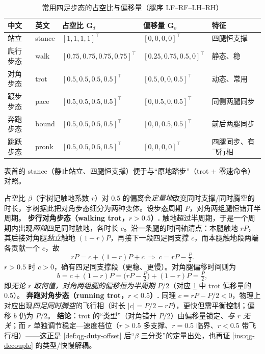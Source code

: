 \begin{table}[H]\centering\small
\caption{常用四足步态的占空比与偏移量（腿序 LF–RF–LH–RH）}
\begin{tabular}{lllll}
\toprule
中文 & 英文 & 占空比 $\mathbf{G}_d$ & 偏移量 $\mathbf{G}_o$ & 特征 \\
\midrule
站立 & stance & $[1,1,1,1]^\top$ & $[0,0,0,0]^\top$ & 四腿恒支撑 \\
爬行步态 & walk & $[0.75,0.75,0.75,0.75]^\top$ & $[0.25,0.75,0.5,0]^\top$ & 静态、稳 \\
对角步态 & trot & $[0.5,0.5,0.5,0.5]^\top$ & $[0.5,0,0,0.5]^\top$ & 动态、常用 \\
踱步步态 & pace & $[0.5,0.5,0.5,0.5]^\top$ & $[0,0.5,0,0.5]^\top$ & 同侧两腿同步 \\
奔跑步态 & bound & $[0.5,0.5,0.5,0.5]^\top$ & $[0,0,0.5,0.5]^\top$ & 前后两腿同步 \\
跳跃步态 & pronk & $[0.5,0.5,0.5,0.5]^\top$ & $[0,0,0,0]^\top$ & 四腿同步、有飞行相 \\
\bottomrule
\end{tabular}
\label{tab:qg-gaits}
\end{table}
表首的 stance（静止站立、四腿恒支撑）便于与“原地踏步”（trot $+$ 零速命令）对照。

\begin{example}\label{exam:qg-trot-variants}
占空比 $\beta$（宇树记触地系数 $r$）对 $0.5$ 的偏离会\emph{定量地}改变同时支撑/同时腾空的时长，宇树据此把对角步态细分为两种变体\cite{unitree2023quadruped}。设步态周期 $P$，对角两组腿恒错开半周期。
\textbf{步行对角步态（walking trot，$r>0.5$）.} 触地超过半周期，于是一个周期内出现\emph{两段}四足同时触地，各时长 $c$。沿一条腿的时间轴清点：本腿触地 $rP$，其后接对角腿\emph{独立}触地 $(1-r)P$，再接下一段四足同支撑 $c$，而本腿触地段两端各贡献一个 $c$，故
\begin{equation}
  rP=c+(1-r)P+c\ \Longrightarrow\ c=rP-\tfrac{P}{2}.
  \label{eq:qg-trot-overlap}
\end{equation}
$r>0.5$ 时 $c>0$，确有四足同支撑段（更稳、更慢）。对角腿偏移时间则为
\begin{equation}
  b=c+(1-r)P=\Big(rP-\tfrac{P}{2}\Big)+(1-r)P=\tfrac{P}{2},
  \label{eq:qg-trot-offset}
\end{equation}
即\emph{无论 $r$ 取何值，对角两组腿的偏移恒为半周期} $P/2$（对应 \cref{tab:qg-gaits} 中 trot 偏移量的 $0.5$）。
\textbf{奔跑对角步态（running trot，$r<0.5$）.} 同理 $c=rP-P/2<0$，物理上对应出现\emph{四足同时腾空}的飞行相（时长 $|c|=P/2-rP$），更快但需平衡控制；偏移 $b$ 仍为 $P/2$。
\textbf{结论}：trot 的“类型”（对角错开 $P/2$）由偏移量锁定、\emph{与 $r$ 无关}；而 $r$ 单独调节稳定—速度档位（$r>0.5$ 多支撑、$r=0.5$ 临界、$r<0.5$ 带飞行相）——这正是 \cref{def:qg-duty-offset} 后“$\beta$ 三分类”的定量出处，也再证 \cref{ins:qg-decouple} 的类型/快慢解耦。
\end{example}

